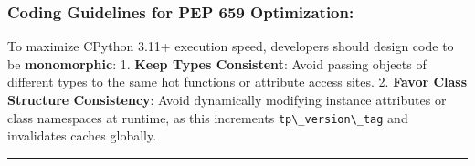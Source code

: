 \hypertarget{coding-guidelines-for-pep-659-optimization}{%
\subsubsection{Coding Guidelines for PEP 659
Optimization:}\label{coding-guidelines-for-pep-659-optimization}}

To maximize CPython 3.11+ execution speed, developers should design code
to be \textbf{monomorphic}: 1. \textbf{Keep Types Consistent}: Avoid
passing objects of different types to the same hot functions or
attribute access sites. 2. \textbf{Favor Class Structure Consistency}:
Avoid dynamically modifying instance attributes or class namespaces at
runtime, as this increments \passthrough{\lstinline!tp\_version\_tag!}
and invalidates caches globally.

\begin{center}\rule{0.5\linewidth}{0.5pt}\end{center}
